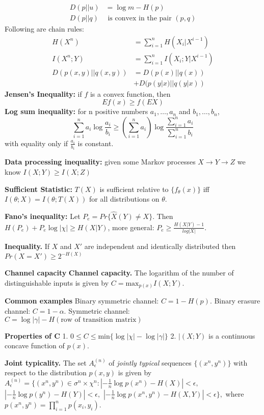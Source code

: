 \documentclass[10pt]{article}
\begin{document}
\begin{tiny}
\begin{multicols}{3}
\begin{align}
D(p||u)&=\log m - H(p)\label{eq:chimu}\\
D(p||q)&\text{ is convex in the pair }(p,q)
\end{align}
Following are chain rules:
\begin{align}
H(X^n)&=\sum_{i=1}^n H(X_i|X^{i-1})\\
I(X^n;Y)&=\sum_{i=1}^n I(X_i;Y|X^{i-1})\\
D(p(x,y)||q(x,y))&=D(p(x)||q(x))\\
&+D(p(y|x)||q(y|x))
\end{align}
{\bf Jensen's Inequality:} if $f$ is a convex function, then
\begin{equation}
Ef(x) \geq f(EX)
\end{equation}
{\bf Log sum inequality:} for n positive numbers $a_1,\ldots,a_n$ and $b_1,\ldots,b_n$,
\begin{equation}
\sum_{i=1}^n a_i \log \frac{a_i}{b_i} \geq \left( \sum_{i=1}^n a_i \right) \log \frac{\sum_{i=1}^n a_i}{\sum_{i=1}^n b_i}
\end{equation}
with equality only if $\frac{a_i}{b_i}$ is constant. 

{\bf Data processing inequality:} given some Markov processes $X\rightarrow Y\rightarrow Z$ we know $I(X;Y)\geq I(X;Z)$

{\bf Sufficient Statistic:} $T(X)$ is sufficient relative to $\{f_\theta (x)\}$ iff $I(\theta;X)=I(\theta;T(X))$ for all distributions on $\theta$.

{\bf Fano's inequality:} Let $P_e=Pr\{\hat{X}(Y)\neq X\}$. Then $H(P_e)+P_e \log |\chi| \geq H(X|Y)$, more general: $P_e \geq \frac{H(X|Y)-1}{log|X|}$.

{\bf Inequality.} If $X$ and $X'$ are independent and identically distributed then $Pr(X=X') \geq 2^{-H(X)}$


\textbf{\scriptsize Channel capacity}
{\bf Channel capacity.} The logarithm of the number of distinguishable inputs is given by $ C= \text{max}_{p(x)} I(X;Y).$

{\bf Common examples} Binary symmetric channel: $C= 1 - H(p)$. Binary erasure channel: $C = 1 - \alpha$. Symmetric channel: $C= \log |\gamma | - H(\text{row of transition matrix})$

{\bf Properties of C}  1. $0 \leq C \leq \text{min}\{\log |\chi| - \log | \gamma | \}$  2. $|(X;Y)$ is a continuous concave function of $p(x)$.

{\bf Joint typicality.}  The set $A_{\epsilon}^{(n)}$ of {\it jointly typical} sequences $\{(x^{n},y^{n})\}$ with respect to the distribution $p(x,y)$ is given by $A_{\epsilon}^{(n)} = \{ (x^{n},y^{n}) \in \sigma^{n} \times \chi^{n}: \left| -\frac{1}{n}\log p(x^{n}) - H(X) \right| < \epsilon, $ $\left| -\frac{1}{n}\log p(y^{n}) - H(Y) \right| <\epsilon, $ $\left| -\frac{1}{n} \log p(x^{n},y^{n})-H(X,Y) \right| <\epsilon \}, $ where $p(x^{n},y^{n}) = \prod_{i=1}^{n}p(x_{i},y_{i}).$



\end{multicols}
\end{tiny}
\end{document}
